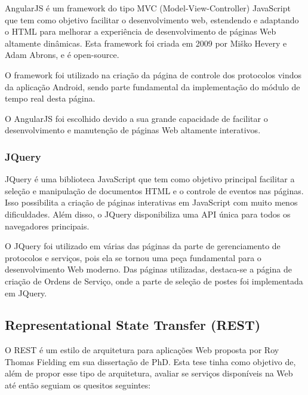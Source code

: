 \documentclass[
	article,			%
	11pt,				%
	oneside,			%
	a4paper,			%
	english,			%
	brazil,				%
	sumario=tradicional
	]{abntex2}
\begin{document}
AngularJS é um framework do tipo MVC (Model-View-Controller) JavaScript que tem como objetivo facilitar o desenvolvimento web, estendendo e adaptando o HTML para melhorar a experiência de desenvolvimento de páginas Web altamente dinâmicas.
Esta framework foi criada em 2009 por Miško Hevery e Adam Abrons, e é open-source. \cite{angularjs}

O framework foi utilizado na criação da página de controle dos protocolos vindos da aplicação Android, sendo parte fundamental da implementação do módulo de tempo real desta página.

O AngularJS foi escolhido devido a sua grande capacidade de facilitar o desenvolvimento e manutenção de páginas Web altamente interativos.

\subsubsection{JQuery}

JQuery é uma biblioteca JavaScript que tem como objetivo principal facilitar a seleção e manipulação de documentos HTML e o controle de eventos nas páginas.
Isso possibilita a criação de páginas interativas em JavaScript com muito menos dificuldades.
Além disso, o JQuery disponibiliza uma API única para todos os navegadores principais. \cite{jquery}

O JQuery foi utilizado em várias das páginas da parte de gerenciamento de protocolos e serviços, pois ela se tornou uma peça fundamental para o desenvolvimento Web moderno.
Das páginas utilizadas, destaca-se a página de criação de Ordens de Serviço, onde a parte de seleção de postes foi implementada em JQuery.

\subsection{Representational State Transfer (REST)}

O REST é um estilo de arquitetura para aplicações Web proposta por Roy Thomas Fielding em sua dissertação de PhD. \cite{fielding}
Esta tese tinha como objetivo de, além de propor esse tipo de arquitetura, avaliar se serviços disponíveis na Web até então seguiam os quesitos seguintes:
\end{document}

